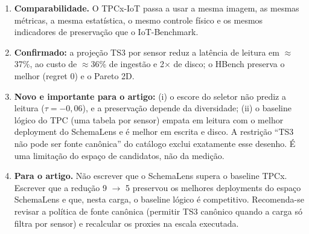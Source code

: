 \begin{enumerate}
\item \textbf{Comparabilidade.} O TPCx-IoT passa a usar a mesma imagem, as mesmas métricas, a mesma estatística, o mesmo controle físico e os mesmos indicadores de preservação que o IoT-Benchmark.
\item \textbf{Confirmado:} a projeção TS3 por sensor reduz a latência de leitura em $\approx$37\%, ao custo de $\approx$36\% de ingestão e 2$\times$ de disco; o HBench preserva o melhor (regret 0) e o Pareto 2D.
\item \textbf{Novo e importante para o artigo:} (i) o escore do seletor não prediz a leitura ($\tau=-0{,}06$), e a preservação depende da diversidade; (ii) o baseline lógico do TPC (uma tabela por sensor) empata em leitura com o melhor deployment do SchemaLens e é melhor em escrita e disco. A restrição ``TS3 não pode ser fonte canônica'' do catálogo exclui exatamente esse desenho. É uma limitação do espaço de candidatos, não da medição.
\item \textbf{Para o artigo.} Não escrever que o SchemaLens supera o baseline TPCx. Escrever que a redução 9 $\rightarrow$ 5 preservou os melhores deployments do espaço SchemaLens e que, nesta carga, o baseline lógico é competitivo. Recomenda-se revisar a política de fonte canônica (permitir TS3 canônico quando a carga só filtra por sensor) e recalcular os proxies na escala executada.
\end{enumerate}
